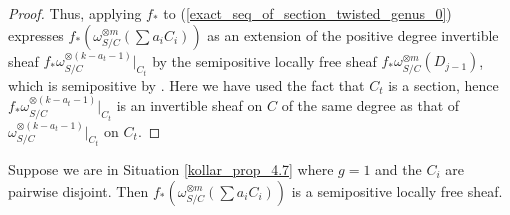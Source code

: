\begin{proof}
Thus, applying $f_{*}$ to (\ref{exact_seq_of_section_twisted_genus_0}) expresses $f_{*}(\omega_{S/C}^{\otimes m}(\sum a_iC_i))$ as an extension of the positive degree invertible sheaf $f_{*}\omega_{S/C}^{\otimes (k-a_{t}-1)}|_{C_t}$ by the semipositive locally free sheaf $f_{*}\omega_{S/C}^{\otimes m}(D_{j-1})$, which is semipositive by .
Here we have used the fact that $C_t$ is a section, hence $f_{*}\omega_{S/C}^{\otimes (k-a_{t}-1)}|_{C_t}$ is an invertible sheaf on $C$ of the same degree as that of $\omega_{S/C}^{\otimes (k-a_{t}-1)}|_{C_t}$ on $C_t$.
\end{proof}

\begin{lemma}\label{inductive_step_genus_1}
Suppose we are in Situation \ref{kollar_prop_4.7} where $g=1$ and the $C_i$ are pairwise disjoint.
Then $f_{*}(\omega_{S/C}^{\otimes m}(\sum a_iC_i))$ is a semipositive locally free sheaf.
\end{lemma}
